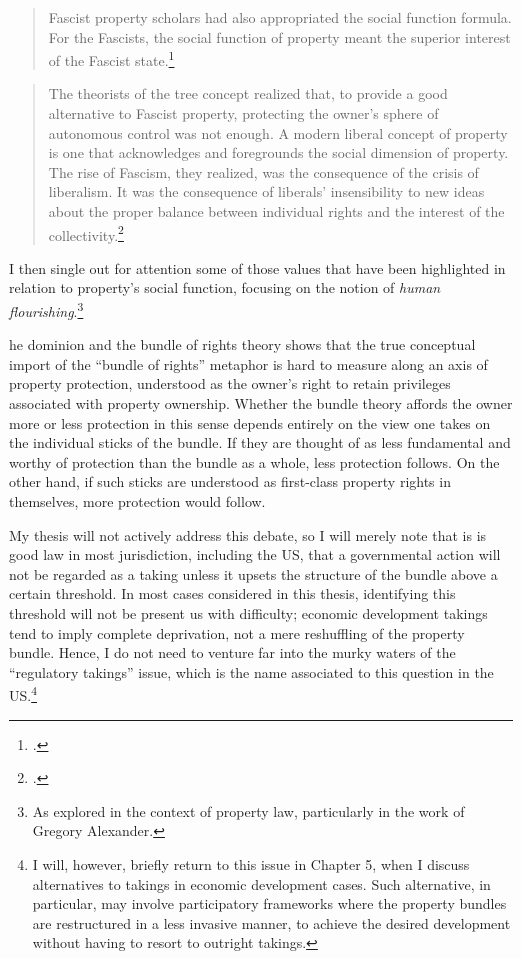 \begin{quote}
Fascist property scholars had also appropriated the social function formula. For the Fascists,
the social function of property meant the superior interest of the Fascist state.\footcite[908-909]{robilant13}
\end{quote}

\begin{quote}
The theorists of the tree concept realized that,
to provide a good alternative to Fascist property, protecting the owner's sphere of
autonomous control was not enough. A modern liberal concept of
property is one that acknowledges and
foregrounds the social dimension of property. The rise of Fascism, they realized, was the
consequence of the crisis of liberalism. It was the consequence of liberals' insensibility to new ideas about the proper balance between individual rights and the interest of the collectivity.\footcite[907]{robilant13}
\end{quote}


I then single out for attention some of those values that have been highlighted in relation to property's social function, focusing on the notion of {\it human flourishing}.\footnote{As explored in the context of property law, particularly in the work of Gregory Alexander.}

he dominion and the bundle of rights theory shows that the true conceptual import of the ``bundle of rights'' metaphor is hard to measure along an axis of property protection, understood as the owner's right to retain privileges associated with property ownership. Whether the bundle theory affords the owner more or less protection in this sense depends entirely on the view one takes on the individual sticks of the bundle. If they are thought of as less fundamental and worthy of protection than the bundle as a whole, less protection follows. On the other hand, if such sticks are understood as first-class property rights in themselves, more protection would follow.

My thesis will not actively address this debate, so I will merely note that is is good law in most jurisdiction, including the US, that a governmental action will not be regarded as a taking unless it upsets the structure of the bundle above a certain threshold. In most cases considered in this thesis, identifying this threshold will not be present us with difficulty; economic development takings tend to imply complete deprivation, not a mere reshuffling of the property bundle. Hence, I do not need to venture far into the murky waters of the ``regulatory takings'' issue, which is the name associated to this question in the US.\footnote{I will, however, briefly return to this issue in Chapter 5, when I discuss alternatives to takings in economic development cases. Such alternative, in particular, may involve participatory frameworks where the property bundles are restructured in a less invasive manner, to achieve the desired development without having to resort to outright takings.}

